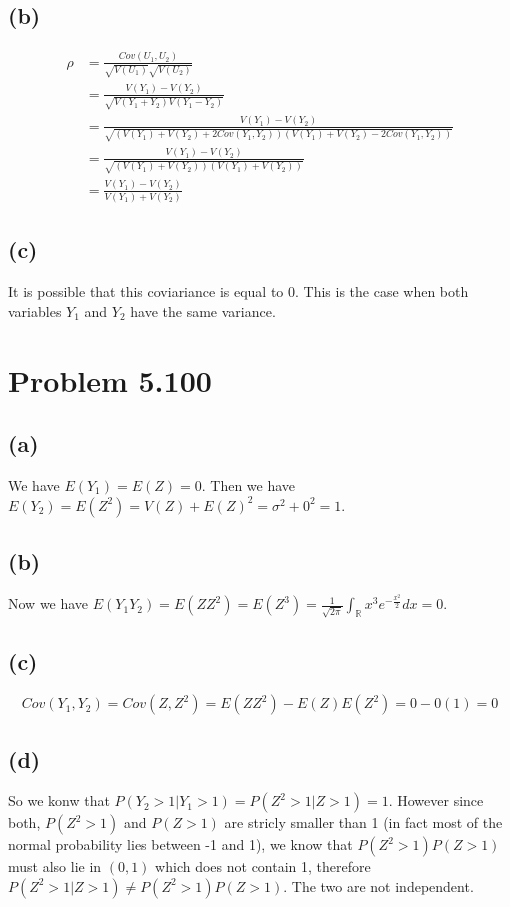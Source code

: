\documentclass{article}
\theoremstyle{definition}
\begin{document}
    \subsection*{(b)}
        \begin{align*}
            \rho & = \frac{Cov(U_1, U_2)}{\sqrt{V(U_1)}\sqrt{V(U_2)}} \\
            & = \frac{V(Y_1) - V(Y_2)}{\sqrt{V(Y_1 + Y_2)V(Y_1 - Y_2)}}\\
            &= \frac{V(Y_1) - V(Y_2)}{\sqrt{(V(Y_1) + V(Y_2) + 2Cov(Y_1,Y_2))(V(Y_1) + V(Y_2) - 2Cov(Y_1,Y_2))}} \\
            &= \frac{V(Y_1)- V(Y_2)}{\sqrt{(V(Y_1) + V(Y_2))(V(Y_1) + V(Y_2))}}\\
            &= \frac{V(Y_1) - V(Y_2)}{V(Y_1) + V(Y_2)}
        \end{align*}
    \subsection*{(c)}
        It is possible that this coviariance is equal to 0. This is the case when
        both variables $Y_1$ and $Y_2$ have the same variance.
\section*{Problem 5.100}
    \subsection*{(a)}
        We have $E(Y_1) = E(Z) = 0$. Then we have $E(Y_2) = E(Z^2) = V(Z) + E(Z)^2 = \sigma^2 + 0^2 = 1$.
    \subsection*{(b)}
        Now we have $E(Y_1Y_2) = E(Z Z^2) = E(Z^3) = \frac{1}{\sqrt{2\pi}} \int_\mathbb{R} x^3 e^{-\frac{x^2}{2}}dx = 0$.
    \subsection*{(c)}
        \[
            Cov(Y_1,Y_2) = Cov(Z,Z^2) = E(ZZ^2) - E(Z)E(Z^2) = 0 - 0(1) = 0
        \]
    \subsection*{(d)}
        So we konw that $P(Y_2 > 1 | Y_1 > 1) = P(Z^2 > 1 | Z > 1) = 1$. However since both, $P(Z^2 > 1)$ and $P(Z > 1)$ are 
        stricly smaller than 1 (in fact most of the normal probability lies between -1 and 1), we know that $P(Z^2>1)P(Z>1)$ 
        must also lie in $(0,1)$ which does not contain 1, therefore $P(Z^2 > 1 | Z > 1) \neq P(Z^2>1)P(Z>1)$. The two are not 
        independent.
\end{document}
